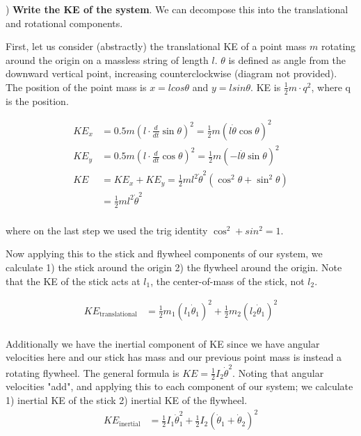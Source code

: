 \documentclass[conference]{IEEEtran}
\begin{document}
) \textbf{Write the KE of the system}. We can decompose this into the translational and
rotational components.

First, let us consider (abstractly) the translational KE of a point mass $m$ rotating
around the origin on a massless string of length $l$. $\theta$ is defined as
angle from the downward vertical point, increasing counterclockwise  (diagram not provided).
The position of the point mass is $x = l cos \theta$ and $y = l sin \theta$.
KE is $\frac{1}{2} m \cdot q^2$, where q is the position.

\begin{align}
    KE_x &= 0.5 m (l \cdot \frac{d}{dt} \sin \theta)^2 = \frac{1}{2} m (l \dot\theta \cos \theta)^2 \\
    KE_y &= 0.5 m (l \cdot \frac{d}{dt} \cos \theta)^2  = \frac{1}{2} m (- l \dot\theta \sin\theta)^2 \\
    KE &= KE_x + KE_y = \frac{1}{2} m l^2 \dot \theta^2 (\cos^2 \theta + \sin^2 \theta) \\
       &= \frac{1}{2} m l^2 \dot\theta^2 \\
\end{align}

where on the last step we used the trig identity $\cos^2 + sin^2 = 1$.

Now applying this to the stick and flywheel components of our system, we
calculate 1) the stick around the origin 2) the flywheel around the origin. Note
that the KE of the stick acts at $l_1$, the center-of-mass of the stick, not
$l_2$.

\begin{align}
    KE_{\text{translational}} &= \frac{1}{2} m_1 (l_1 \dot\theta_1)^2 + \frac{1}{2} m_2 (l_2 \dot\theta_1)^2\\
\end{align}

Additionally we have the inertial component of KE since we have angular
velocities here and our stick has mass and our previous point mass is instead a rotating
flywheel. The general formula is $KE = \frac{1}{2} I_2 \dot\theta^2$.
Noting that angular velocities "add", and applying this to each component of our
system; we calculate 1) inertial KE of the stick 2) inertial KE of the flywheel.
\begin{align}
    KE_{\text{inertial}} &= \frac{1}{2} I_1 \dot\theta_1^2 + \frac{1}{2}
    I_2 (\dot\theta_1 + \dot\theta_2)^2
\end{align}
\end{document}
